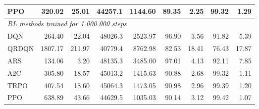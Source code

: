 \begin{samepage}
\begin{center}
\begin{tabular}{l|rr|rr|rr|rr}
    PPO          &   320.02 &    25.01 &    44257.1 &    1144.60 &   89.35 &    2.25 &   99.32 &    1.29 \\
    \midrule
    \multicolumn{9}{l}{\textit{RL methods trained for 1.000.000 steps}} \\
    \midrule
    DQN          &   264.40 &    22.04 &    48026.3 &    2523.97 &   96.90 &    3.56 &   91.82 &    5.39 \\
    QRDQN        &  1807.17 &   211.97 &    40779.4 &    8762.98 &   82.53 &   18.41 &   76.43 &   17.87 \\
    ARS          &   134.06 &     3.20 &    48135.3 &    3485.00 &   97.01 &    4.13 &   92.11 &    7.85 \\
    A2C          &   305.80 &    18.57 &    45013.2 &    1415.63 &   90.88 &    2.68 &   99.32 &    1.11 \\
    TRPO         &   407.54 &    18.60 &    45064.3 &    1473.05 &   90.98 &    2.96 &   99.39 &    1.20 \\
    PPO          &   638.89 &    43.66 &    44629.5 &    1035.03 &   90.14 &    3.12 &   99.42 &    1.07 \\
    \bottomrule
  \end{tabular}
\end{center}
\end{samepage}

